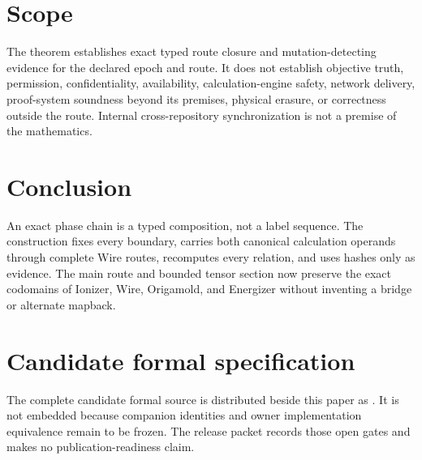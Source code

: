 \documentclass[11pt,letterpaper]{article}
\theoremstyle{definition}
\begin{document}
\section{Scope}

The theorem establishes exact typed route closure and mutation-detecting
evidence for the declared epoch and route.  It does not establish objective
truth, permission, confidentiality, availability, calculation-engine safety,
network delivery, proof-system soundness beyond its premises, physical
erasure, or correctness outside the route.  Internal cross-repository
synchronization is not a premise of the mathematics.

\section{Conclusion}

An exact phase chain is a typed composition, not a label sequence.  The
construction fixes every boundary, carries both canonical calculation operands
through complete Wire routes, recomputes every relation, and uses hashes only
as evidence.
The main route and bounded tensor section now preserve the exact codomains of
Ionizer, Wire, Origamold, and Energizer without inventing a bridge or alternate
mapback.

\appendix
\section{Candidate formal specification}

The complete candidate formal source is distributed beside this paper as
.  It is not
embedded because companion identities and owner implementation equivalence
remain to be frozen.  The release packet records those open gates and makes no
publication-readiness claim.



\end{document}
